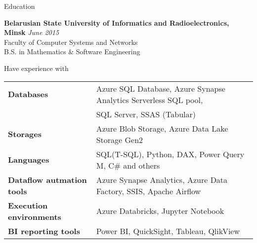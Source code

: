 \documentclass{resume} %
\begin{document}

\begin{rSection}{Education}

{\bf Belarusian State University of Informatics and Radioelectronics, Minsk} \hfill {\em June 2015} \\ 
Faculty of Computer Systems and Networks \\
B.S. in Mathematics \& Software Engineering \\

\end{rSection}


\begin{rSection}{Have experience with}

\begin{tabular}{ @{} >{\bfseries}l @{\hspace{6ex}} l }
Databases          & Azure SQL Database, Azure Synapse Analytics Serverless SQL pool, \smallskip \\
 & SQL Server, SSAS (Tabular) \smallskip \\
Storages  & Azure Blob Storage, Azure Data Lake Storage Gen2 \smallskip \\
Languages  & SQL(T-SQL), Python, DAX, Power Query M, C\# and others \smallskip \\
Dataflow autmation tools & Azure Synapse Analytics, Azure Data Factory, SSIS, Apache Airflow \smallskip \\
Execution environments & Azure Databricks, Jupyter Notebook \smallskip \\
BI reporting tools               & Power BI, QuickSight, Tableau, QlikView \smallskip \\
\end{tabular}

\end{rSection}

\end{document}
